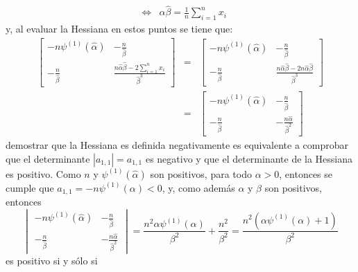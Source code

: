 \begin{solucion}
\begin{enumerate}
\begin{eqnarray*}
   & \Leftrightarrow & \widehat{\alpha}\widehat{\beta} = \frac{1}{n}\sum_{i=1}^n x_i
  \end{eqnarray*}
  y, al evaluar la Hessiana en estos puntos se tiene que:
  \begin{eqnarray*}
   \begin{bmatrix}
    -n\psi^{(1)}\left(\widehat{\alpha}\right) & \displaystyle{ -\frac{n}{\widehat{\beta}} } \\
    \displaystyle{ -\frac{n}{\widehat{\beta}} } & \displaystyle{ \frac{n\widehat{\alpha}\widehat{\beta} - 2\sum_{i=1}^n x_i}{\widehat{\beta}^3} }
   \end{bmatrix}
   & = & 
   \begin{bmatrix}
    -n\psi^{(1)}\left(\widehat{\alpha}\right) & \displaystyle{ -\frac{n}{\widehat{\beta}} } \\
    \displaystyle{ -\frac{n}{\widehat{\beta}} } & \displaystyle{ \frac{n\widehat{\alpha}\widehat{\beta} - 2n\widehat{\alpha}\widehat{\beta}}{\widehat{\beta}^3} }
   \end{bmatrix}
   \\
   & = &
   \begin{bmatrix}
    -n\psi^{(1)}\left(\widehat{\alpha}\right) & \displaystyle{ -\frac{n}{\widehat{\beta}} } \\
    \displaystyle{ -\frac{n}{\widehat{\beta}} } & \displaystyle{ - \frac{n\widehat{\alpha}}{\widehat{\beta}^2} }
   \end{bmatrix}
  \end{eqnarray*}
  demostrar que la Hessiana es definida negativamente es equivalente a comprobar que el determinante $\left| a_{1,1} \right| = a_{1,1}$ es negativo y que el determinante de la Hessiana es positivo. Como $n$ y $\psi^{(1)}\left( \widehat{\alpha} \right)$ son positivos, para todo $\alpha > 0$, entonces se cumple que $a_{1,1} = -n\psi^{(1)}(\alpha) < 0$, y, como adem\'as $\alpha$ y $\beta$ son positivos, entonces
  \begin{equation*}
   \begin{vmatrix}
    -n\psi^{(1)}\left(\widehat{\alpha}\right) & \displaystyle{ -\frac{n}{\widehat{\beta}} } \\
    \displaystyle{ -\frac{n}{\widehat{\beta}} } & \displaystyle{ - \frac{n\widehat{\alpha}}{\widehat{\beta}^2} }
   \end{vmatrix} 
   = \frac{n^2\alpha\psi^{(1)}(\alpha)}{\beta^2} + \frac{n^2}{\beta^2} = \frac{n^2\left( \alpha\psi^{(1)}(\alpha) + 1 \right)}{\beta^2}
  \end{equation*}
  es positivo si y s\'olo si

\end{enumerate}
\end{solucion}
